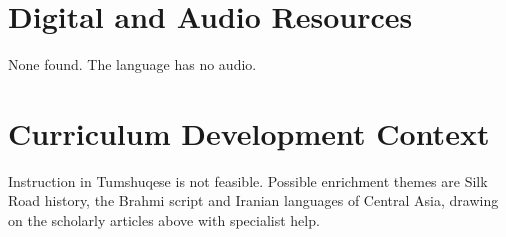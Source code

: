\documentclass[12pt]{article}
\begin{document}
\section{Digital and Audio Resources}
None found. The language has no audio.

\section{Curriculum Development Context}
Instruction in Tumshuqese is not feasible. Possible enrichment themes are Silk Road history, the Brahmi script and Iranian languages of Central Asia, drawing on the scholarly articles above with specialist help.
\end{document}
